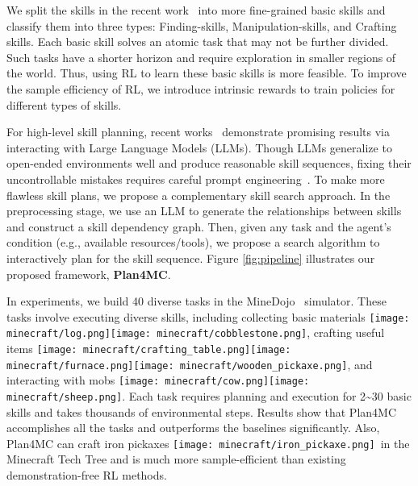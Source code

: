 \documentclass{article}
\newcommand{\mccobblestone}{\texttt{[image: minecraft/cobblestone.png]}}
\newcommand{\mccow}{\texttt{[image: minecraft/cow.png]}}
\newcommand{\mccraftingtable}{\texttt{[image: minecraft/crafting\_table.png]}}
\newcommand{\mcfurnace}{\texttt{[image: minecraft/furnace.png]}}
\newcommand{\mclog}{\texttt{[image: minecraft/log.png]}}
\newcommand{\mcsheep}{\texttt{[image: minecraft/sheep.png]}}
\newcommand{\mcwoodenpickaxe}{\texttt{[image: minecraft/wooden\_pickaxe.png]}}
\newcommand{\mcironpickaxe}{\texttt{[image: minecraft/iron\_pickaxe.png]}}
\begin{document}
We split the skills in the recent work~\citep{deps} into more fine-grained basic skills and classify them into three types: Finding-skills, Manipulation-skills, and Crafting skills. 
Each basic skill solves an atomic task that may not be further divided. Such tasks have a shorter horizon and require exploration in smaller regions of the world. 
Thus, using RL to learn these basic skills is more feasible. 
To improve the sample efficiency of RL, we introduce intrinsic rewards to train policies for different types of skills.

For high-level skill planning, recent works~\citep{saycan, deps, voyager} demonstrate promising results via interacting with Large Language Models (LLMs). Though LLMs generalize to open-ended environments well and produce reasonable skill sequences, fixing their uncontrollable mistakes requires careful prompt engineering~\citep{inner-monologue, deps}. To make more flawless skill plans, we propose a complementary skill search approach. In the preprocessing stage, we use an LLM to generate the relationships between skills and construct a skill dependency graph. Then, given any task and the agent's condition (e.g., available resources/tools), we propose a search algorithm to interactively plan for the skill sequence. Figure \ref{fig:pipeline} illustrates our proposed framework, \textbf{Plan4MC}.

In experiments, we build 40 diverse tasks in the MineDojo~\citep{minedojo} simulator. These tasks involve executing diverse skills, including collecting basic materials \mclog \mccobblestone, crafting useful items \mccraftingtable \mcfurnace \mcwoodenpickaxe, and interacting with mobs \mccow \mcsheep. Each task requires planning and execution for 2\textasciitilde30 basic skills and takes thousands of environmental steps. Results show that Plan4MC accomplishes all the tasks and outperforms the baselines significantly. Also, Plan4MC can craft iron pickaxes \mcironpickaxe \ in the Minecraft Tech Tree and is much more sample-efficient than existing demonstration-free RL methods.
\end{document}
